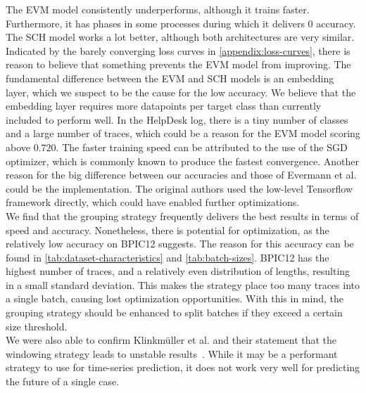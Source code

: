 The EVM model consistently underperforms, although it trains faster.
Furthermore, it has phases in some processes during which it delivers $0$ accuracy.
The SCH model works a lot better, although both architectures are very similar.
Indicated by the barely converging loss curves in \autoref{appendix:loss-curves}, there is reason to believe that something prevents the EVM model from improving.
The fundamental difference between the EVM and SCH models is an embedding layer, which we suspect to be the cause for the low accuracy.
We believe that the embedding layer requires more datapoints per target class than currently included to perform well.
In the HelpDesk log, there is a tiny number of classes and a large number of traces, which could be a reason for the EVM model scoring above $0.720$.
The faster training speed can be attributed to the use of the SGD optimizer, which is commonly known to produce the fastest convergence.
Another reason for the big difference between our accuracies and those of Evermann et al. could be the implementation.
The original authors used the low-level Tensorflow framework directly, which could have enabled further optimizations.\\

We find that the grouping strategy frequently delivers the best results in terms of speed and accuracy.
Nonetheless, there is potential for optimization, as the relatively low accuracy on BPIC12 suggests.
The reason for this accuracy can be found in \autoref{tab:dataset-characteristics} and \autoref{tab:batch-sizes}.
BPIC12 has the highest number of traces, and a relatively even distribution of lengths, resulting in a small standard deviation.
This makes the strategy place too many traces into a single batch, causing lost optimization opportunities.
With this in mind, the grouping strategy should be enhanced to split batches if they exceed a certain size threshold.\\

We were also able to confirm Klinkmüller et al. and their statement that the windowing strategy leads to unstable results~\cite{klinkmuller2018reliablemonitoring}.
While it may be a performant strategy to use for time-series prediction, it does not work very well for predicting the future of a single case.\\

